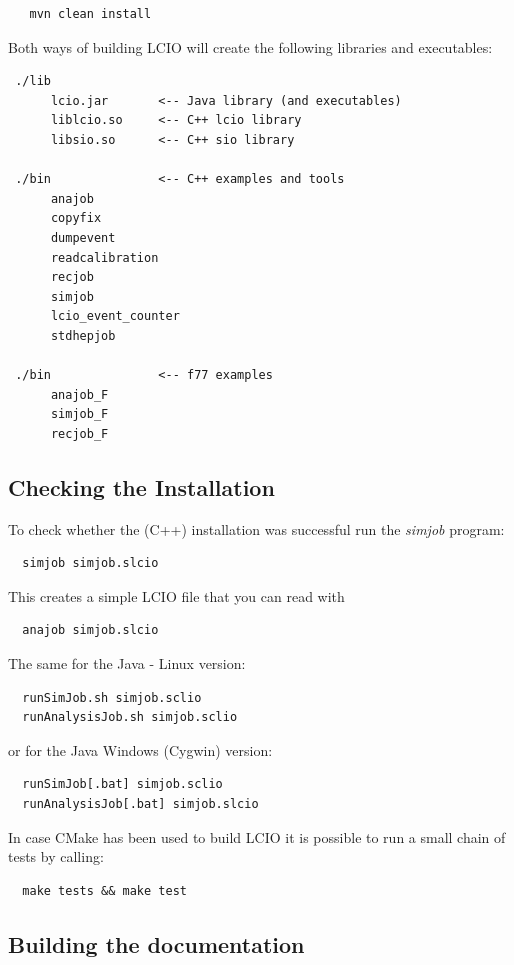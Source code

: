 \documentclass[twoside]{article}
\begin{document}
\begin{verbatim}
   mvn clean install
\end{verbatim}



Both ways of building LCIO will create the following libraries and executables:

\begin{verbatim}
 ./lib
      lcio.jar       <-- Java library (and executables)
      liblcio.so     <-- C++ lcio library
      libsio.so      <-- C++ sio library
      
 ./bin               <-- C++ examples and tools
      anajob
      copyfix
      dumpevent
      readcalibration
      recjob
      simjob
      lcio_event_counter
      stdhepjob

 ./bin               <-- f77 examples
      anajob_F
      simjob_F
      recjob_F 

\end{verbatim}


\subsection {Checking the Installation}

To check whether the (C++) installation was successful run the {\it simjob} program:
\begin{verbatim}
  simjob simjob.slcio
\end{verbatim}
This creates a simple LCIO file that you can read with 
\begin{verbatim}
  anajob simjob.slcio
\end{verbatim}
The same for the Java - Linux version:
\begin{verbatim}
  runSimJob.sh simjob.sclio
  runAnalysisJob.sh simjob.sclio
\end{verbatim}
or for the Java Windows (Cygwin) version:
\begin{verbatim}
  runSimJob[.bat] simjob.sclio
  runAnalysisJob[.bat] simjob.slcio
\end{verbatim}
In case CMake has been used to build LCIO it is possible to run a small chain of tests by calling:
\begin{verbatim}
  make tests && make test
\end{verbatim}



\subsection {Building the documentation} \label{build_doc}
\end{document}
